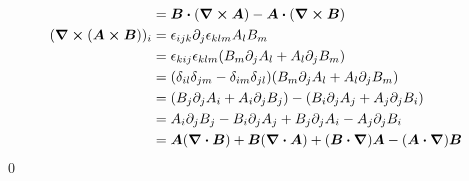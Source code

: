 \documentclass[uplatex,dvipdfmx,a4paper,11pt]{jlreq}
\makeatletter
\newcommand{\rot}{\curl}
\theoremstyle{definition}
\renewenvironment{proof}[1][\proofname]{\par
  \normalfont
  \topsep6\p@\@plus6\p@ \trivlist
  \item[\hskip\labelsep{\bfseries #1}\@addpunct{\bfseries}]\ignorespaces\quad\par
}{%
  \qed\endtrivlist\@endpefalse
}
\renewcommand\proofname{証明}
\makeatother
\begin{document}
\begin{proof}
\begin{align}
                                   & = \bm{B}\vdot(\rot{\bm{A}}) - \bm{A}\vdot(\rot{\bm{B}})                                                                             \\
    (\rot{(\bm{A}\cross\bm{B})})_i & = \epsilon_{ijk}\partial_j\epsilon_{klm}A_lB_m                                                                                      \\
                                   & = \epsilon_{kij}\epsilon_{klm}(B_m\partial_jA_l + A_l\partial_jB_m)                                                                 \\
                                   & = (\delta_{il}\delta_{jm} - \delta_{im}\delta_{jl})(B_m\partial_jA_l + A_l\partial_jB_m)                                            \\
                                   & = (B_j\partial_jA_i + A_i\partial_jB_j) - (B_i\partial_jA_j + A_j\partial_jB_i)                                                     \\
                                   & = A_i\partial_jB_j - B_i\partial_jA_j + B_j\partial_jA_i - A_j\partial_jB_i                                                         \\
                                   & = \bm{A}(\div{\bm{B}}) + \bm{B}(\div{\bm{A}}) + (\bm{B}\vdot\vnabla)\bm{A} - (\bm{A}\vdot\vnabla)\bm{B}
  \end{align}
\end{proof}
\end{document}
